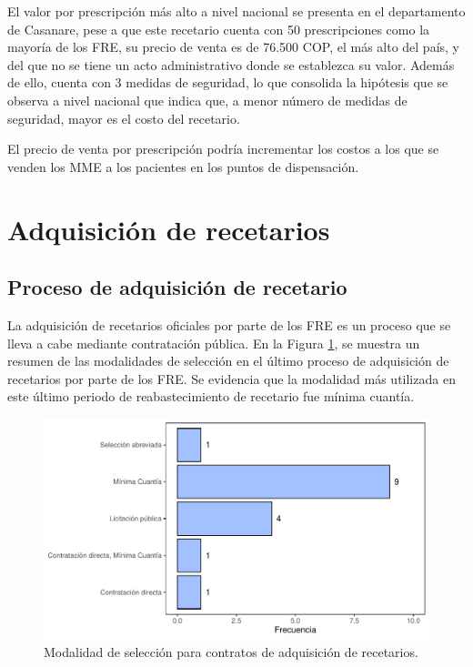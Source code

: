 \documentclass[
]{book}
\begin{document}
El valor por prescripción más alto a nivel nacional se presenta en el departamento de Casanare, pese a que este recetario cuenta con 50 prescripciones como la mayoría de los FRE, su precio de venta es de 76.500 COP, el más alto del país, y del que no se tiene un acto administrativo donde se establezca su valor. Además de ello, cuenta con 3 medidas de seguridad, lo que consolida la hipótesis que se observa a nivel nacional que indica que, a menor número de medidas de seguridad, mayor es el costo del recetario.

El precio de venta por prescripción podría incrementar los costos a los que se venden los MME a los pacientes en los puntos de dispensación.

\hypertarget{adquisiciuxf3n-de-recetarios}{%
\section{Adquisición de recetarios}\label{adquisiciuxf3n-de-recetarios}}


\hypertarget{proceso-de-adquisiciuxf3n-de-recetario}{%
\subsection{Proceso de adquisición de recetario}\label{proceso-de-adquisiciuxf3n-de-recetario}}

La adquisición de recetarios oficiales por parte de los FRE es un proceso que se lleva a cabe mediante contratación pública. En la Figura \ref{fig:modalidadAdquisicion}, se muestra un resumen de las modalidades de selección en el último proceso de adquisición de recetarios por parte de los FRE. Se evidencia que la modalidad más utilizada en este último periodo de reabastecimiento de recetario fue mínima cuantía.

\begin{figure}

{\centering \includegraphics[width=0.85\linewidth]{InformeFinal_files/figure-latex/modalidadAdquisicion-1} 

}

\caption{Modalidad de selección para contratos de adquisición de recetarios.}\label{fig:modalidadAdquisicion}
\end{figure}
\end{document}
